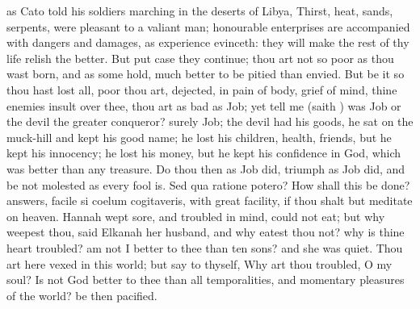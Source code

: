 {as Cato told his soldiers marching in the deserts of Libya, Thirst,
heat, sands, serpents, were pleasant to a valiant man; honourable
enterprises are accompanied with dangers and damages, as experience
evinceth: they will make the rest of thy life relish the better. But
put case they continue; thou art not so poor as thou wast born, and as
some hold, much better to be pitied than envied. But be it so thou hast
lost all, poor thou art, dejected, in pain of body, grief of mind,
thine enemies insult over thee, thou art as bad as Job; yet tell me
(saith \Chrysostom) was Job or the devil the greater conqueror? surely
Job; the devil had his goods, he sat on the muck-hill and kept
his good name; he lost his children, health, friends, but he kept his
innocency; he lost his money, but he kept his confidence in God, which
was better than any treasure. Do thou then as Job did, triumph as Job
did, and be not molested as every fool is. Sed qua ratione
potero? How shall this be done? \Chrysostom answers, facile si coelum
cogitaveris, with great facility, if thou shalt but meditate on heaven.
Hannah wept sore, and troubled in mind, could not eat; but why
weepest thou, said Elkanah her husband, and why eatest thou not? why is
thine heart troubled? am not I better to thee than ten sons? and she
was quiet. Thou art here vexed in this world; but say to thyself,
Why art thou troubled, O my soul? Is not God better to thee than all
temporalities, and momentary pleasures of the world? be then pacified.

}
